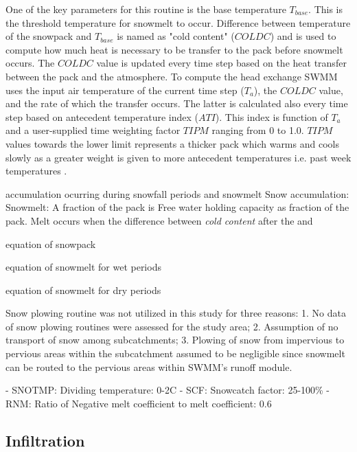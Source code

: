 One of the key parameters for this routine is the base temperature $T_{base}$. This is the threshold temperature for snowmelt to occur. Difference between temperature of the snowpack and $T_{base}$ is named as "cold content" ($COLDC$) and is used to compute how much heat is necessary to be transfer to the pack before snowmelt occurs. The $COLDC$ value is updated every time step based on the heat transfer between the pack and the atmosphere. To compute the head exchange SWMM uses the input air temperature of the current time step ($T_a$), the $COLDC$ value, and the rate of which the transfer occurs. The latter is calculated also every time step based on antecedent temperature index ($ATI$). This index is function of $T_a$ and a user-supplied time weighting factor $TIPM$ ranging from 0 to 1.0. $TIPM$ values towards the lower limit represents a thicker pack which warms and cools slowly as a greater weight is given to more antecedent temperatures i.e. past week temperatures \cite{Rossman2016}. 

accumulation ocurring during snowfall periods and snowmelt
Snow accumulation:
Snowmelt:
A fraction of the pack is Free water holding capacity as fraction of the pack.  Melt occurs when the difference between \textit{cold content} after the  and  

equation of snowpack

equation of snowmelt for wet periods

equation of snowmelt for dry periods



Snow plowing routine was not utilized in this study for three reasons: 1. No data of snow plowing routines were assessed for the study area; 2. Assumption of no transport of snow among subcatchments; 3. Plowing of snow from impervious to pervious areas within the subcatchment assumed to be negligible since snowmelt can be routed to the pervious areas within SWMM's runoff module.




- SNOTMP: Dividing temperature: 0-2C \cite{Rossman2016}
- SCF: Snowcatch factor: 25-100\% 
- RNM: Ratio of Negative melt coefficient to melt coefficient: 0.6





\subsection{Infiltration} \label{infiltration}

